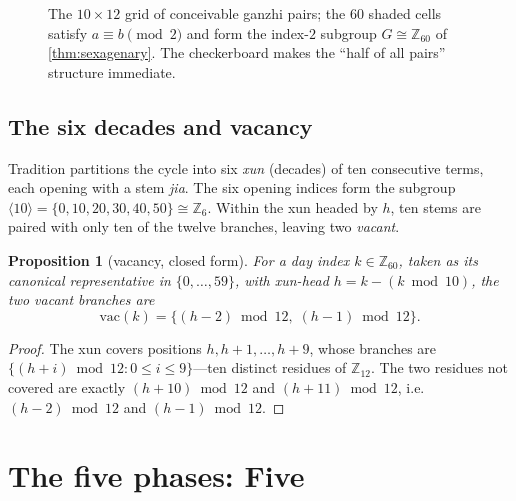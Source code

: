 \documentclass[11pt,a4paper]{article}
\newtheorem{proposition}[theorem]{Proposition}
\theoremstyle{definition}
\theoremstyle{remark}
\newcommand{\Z}{\mathbb{Z}}
\begin{document}
\begin{figure}[h]\centering
{}
\caption{The $10\times12$ grid of conceivable ganzhi pairs; the $60$ shaded cells satisfy $a\equiv b\pmod 2$ and form the index-$2$ subgroup $G\cong\Z_{60}$ of \cref{thm:sexagenary}. The checkerboard makes the ``half of all pairs'' structure immediate.}\label{fig:grid}
\end{figure}

\subsection{The six decades and vacancy}
Tradition partitions the cycle into six \emph{xun} (decades) of ten consecutive terms, each opening with a stem \emph{jia}. The six opening indices form the subgroup $\langle 10\rangle=\{0,10,20,30,40,50\}\cong\Z_6$. Within the xun headed by $h$, ten stems are paired with only ten of the twelve branches, leaving two \emph{vacant}.

\begin{proposition}[vacancy, closed form]\label{prop:vacancy}
For a day index $k\in\Z_{60}$, taken as its canonical representative in $\{0,\dots,59\}$, with xun-head $h=k-(k\bmod 10)$, the two vacant branches are
\[
\mathrm{vac}(k)=\{(h-2)\bmod 12,\;(h-1)\bmod 12\}.
\]
\end{proposition}
\begin{proof}
The xun covers positions $h,h+1,\dots,h+9$, whose branches are $\{(h+i)\bmod 12:0\le i\le 9\}$---ten distinct residues of $\Z_{12}$. The two residues not covered are exactly $(h+10)\bmod 12$ and $(h+11)\bmod 12$, i.e.\ $(h-2)\bmod 12$ and $(h-1)\bmod 12$.
\end{proof}

\section{The five phases: Five}\label{sec:wuxing}
\end{document}
